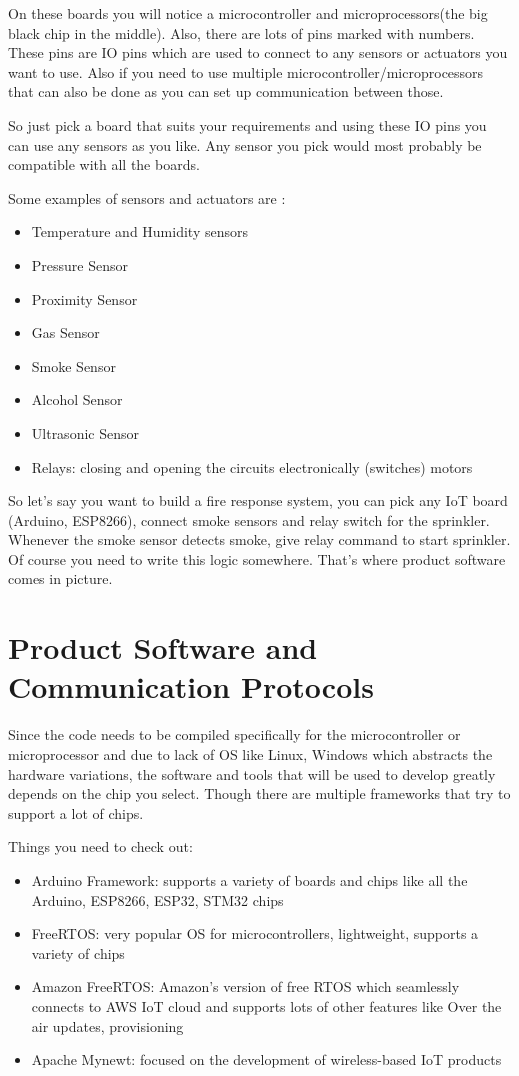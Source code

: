 \documentclass[12pt]{report}
\begin{document}
On these boards you will notice a microcontroller and microprocessors(the big black chip in the middle). Also, there are lots of pins marked with numbers. These pins are IO pins which are used to connect to any sensors or actuators you want to use. Also if you need to use multiple microcontroller/microprocessors that can also be done as you can set up communication between those.

So just pick a board that suits your requirements and using these IO pins you can use any sensors as you like. Any sensor you pick would most probably be compatible with all the boards.

Some examples of sensors and actuators are :

\begin{itemize}
    \item Temperature and Humidity sensors
    \item Pressure Sensor
    \item Proximity Sensor
    \item Gas Sensor
    \item Smoke Sensor
    \item Alcohol Sensor
    \item Ultrasonic Sensor
    \item Relays: closing and opening the circuits electronically (switches) motors
\end{itemize}

So let’s say you want to build a fire response system, you can pick any IoT board (Arduino, ESP8266), connect smoke sensors and relay switch for the sprinkler. Whenever the smoke sensor detects smoke, give relay command to start sprinkler.
Of course you need to write this logic somewhere. That’s where product software comes in picture.

\chapter{Product Software and Communication Protocols}
Since the code needs to be compiled specifically for the microcontroller or microprocessor 
and due to lack of OS like Linux, Windows which abstracts the hardware variations, 
the software and tools that will be used to develop greatly depends on the chip you 
select. Though there are multiple frameworks that try to support a lot of chips.

Things you need to check out:

\begin{itemize}
    \item {Arduino Framework: supports a variety of boards and chips like all the Arduino, ESP8266, ESP32, STM32 chips}
    \item FreeRTOS: very popular OS for microcontrollers, lightweight, supports a variety of chips
    \item Amazon FreeRTOS: Amazon’s version of free RTOS which seamlessly connects to AWS IoT cloud and supports lots of other features like Over the air updates, provisioning
    \item Apache Mynewt: focused on the development of wireless-based IoT products
\end{itemize}
\end{document}
